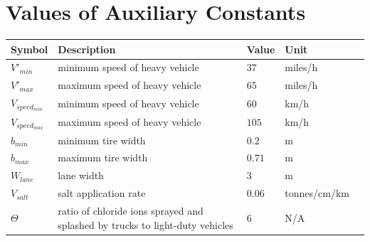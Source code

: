 \documentclass[12pt]{article}
\begin{document}



\section{Values of Auxiliary Constants}




\begin{table}[!h]
  \caption{Auxiliary Constant} \label{TblConstants}
  \renewcommand{\arraystretch}{1.2}
\noindent \begin{longtable*}{l l l l c} 
  \toprule
 \textbf{Symbol} & \textbf{Description} & \textbf{Value} & \textbf{Unit}\\


  \midrule 
  $V'_{min}$ & minimum speed of heavy vehicle & $37$ & miles/h  
  \\
  $V'_{max}$ & maximum speed of heavy vehicle & $65$ & miles/h   
  \\
  $V_{speed_{min}}$ & minimum speed of heavy vehicle & $60$ & km/h   
  \\
  $V_{speed_{max}}$ & maximum speed of heavy vehicle & $105$ & km/h
  \\
  $b_{min}$ & minimum tire width & $0.2$ & m 
  \\
  $b_{max}$ & maximum tire width & $0.71$ & m 
  \\
  $W_{lane}$ & lane width & 3 & m
  \\  
  $V_{salt}$ & salt application rate & 0.06 & tonnes/cm/km
  \\
  $\Theta$ & ratio of chloride ions sprayed and splashed by trucks to light-duty vehicles& 6 & N/A
  \\  
  
  \bottomrule
\end{longtable*}
\end{table}
\end{document}
